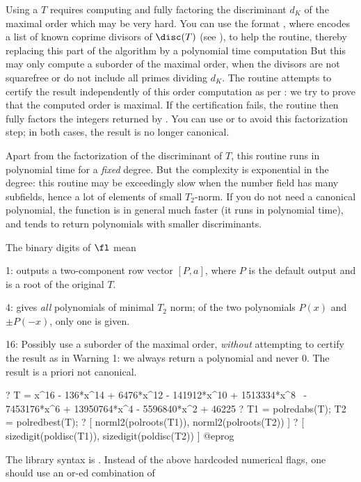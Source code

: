  Using a  $T$ requires computing
and fully factoring the discriminant $d_K$ of the maximal order which may be
very hard. You can use the format \kbd{[T, listP]}, where 
encodes a list of known coprime divisors of $\disc(T)$ (see ),
to help the routine, thereby replacing this part of the algorithm by a
polynomial time computation But this may only compute a suborder of the
maximal order, when the divisors are not squarefree or do not include all
primes dividing $d_K$. The routine attempts to certify the result
independently of this order computation as per : we try to
prove that the computed order is maximal. If the certification fails,
the routine then fully factors the integers returned by .
You can use  or  to avoid this
factorization step; in both cases, the result is no longer canonical.

 Apart from the factorization of the discriminant of
$T$, this routine runs in polynomial time for a \emph{fixed} degree.
But the complexity is exponential in the degree: this routine
may be exceedingly slow when the number field has many subfields, hence a
lot of elements of small $T_2$-norm. If you do not need a canonical
polynomial, the function  is in general much faster (it runs
in polynomial time), and tends to return polynomials with smaller
discriminants.

The binary digits of $\fl$ mean

1: outputs a two-component row vector $[P,a]$, where $P$ is the default
output and  is a root of the original $T$.

4: gives \emph{all} polynomials of minimal $T_2$ norm; of the two polynomials
$P(x)$ and $\pm P(-x)$, only one is given.

16: Possibly use a suborder of the maximal order, \emph{without} attempting to
certify the result as in Warning 1: we always return a polynomial and never
$0$. The result is a priori not canonical.

\bprog
? T = x^16 - 136*x^14 + 6476*x^12 - 141912*x^10 + 1513334*x^8 \
      - 7453176*x^6 + 13950764*x^4 - 5596840*x^2 + 46225
? T1 = polredabs(T); T2 = polredbest(T);
? [ norml2(polroots(T1)), norml2(polroots(T2)) ]
? [ sizedigit(poldisc(T1)), sizedigit(poldisc(T2)) ]
@eprog

The library syntax is .
Instead of the above hardcoded numerical flags, one should use an
or-ed combination of

